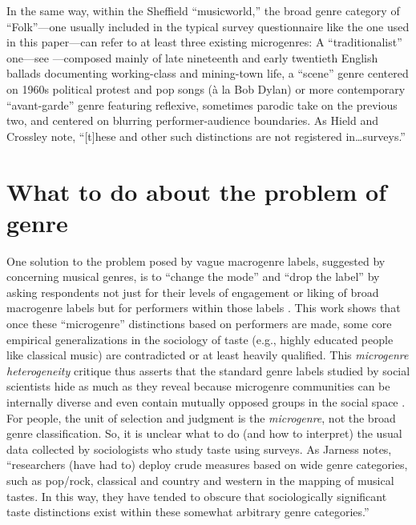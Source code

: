 \documentclass[a4paper,12pt]{article}
\begin{document}
In the same way, within the Sheffield ``musicworld,'' the broad genre category of ``Folk''---one usually included in the typical survey questionnaire like the one used in this paper---can refer to at least three existing microgenres: A ``traditionalist'' one---see \citep{Lena2012}---composed mainly of late nineteenth and early twentieth English ballads documenting working-class and mining-town life, a ``scene'' genre centered on 1960s political protest and pop songs (\`{a} la Bob Dylan) or more contemporary ``avant-garde'' genre featuring reflexive, sometimes parodic take on the previous two, and centered on blurring performer-audience boundaries. As Hield and Crossley \citeyearpar[197]{Hield2014-xe} note, ``[t]hese and other such distinctions are not registered in\ldots surveys.''

\section{What to do about the problem of genre}
One solution to the problem posed by vague macrogenre labels, suggested by \citet{vlegels2015music, vlegels2017music} concerning musical genres, is to ``change the mode'' and ``drop the label'' by asking respondents not just for their levels of engagement or liking of broad macrogenre labels but for performers within those labels \citep{nault2021social}. This work shows that once these ``microgenre'' distinctions based on performers are made, some core empirical generalizations in the sociology of taste (e.g., highly educated people like classical music) are contradicted or at least heavily qualified. This \textit{microgenre heterogeneity} critique thus asserts that the standard genre labels studied by social scientists hide as much as they reveal because microgenre communities can be internally diverse and even contain mutually opposed groups in the social space \citep{flemmen_etal18}. For people, the unit of selection and judgment is the {\em microgenre}, not the broad genre classification. So, it is unclear what to do (and how to interpret) the usual data collected by sociologists who study taste using surveys. As Jarness \citeyearpar{jarness2015} notes, ``researchers (have had to) deploy crude measures based on wide genre categories, such as pop/rock, classical and country and western in the mapping of musical tastes. In this way, they have tended to obscure that sociologically significant taste distinctions exist within these somewhat arbitrary genre categories.''
\end{document}
